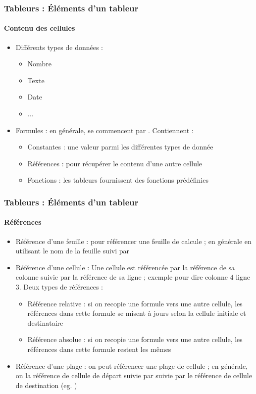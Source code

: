 \documentclass[xcolor=table, usenames,dvipsnames]{beamer}
\begin{document}
\begin{frame}
\frametitle{Tableurs : Éléments d'un tableur}
\framesubtitle{Contenu des cellules}

\begin{itemize}
	\item Différents types de données : 
	\begin{itemize}
		\item Nombre
		\item Texte
		\item Date 
		\item ...
	\end{itemize}

	\item Formules : en générale, se commencent par \keyword{=}. Contiennent :
	\begin{itemize}
		\item Constantes : une valeur parmi les différentes types de donnée
		\item Références : pour récupérer le contenu d'une autre cellule
		\item Fonctions : les tableurs fournissent des fonctions prédéfinies 
	\end{itemize}
	
\end{itemize}


\end{frame}

\begin{frame}
\frametitle{Tableurs : Éléments d'un tableur}
\framesubtitle{Références}

\begin{itemize}
	\item Référence d'une feuille : pour référencer une feuille de calcule ; en générale en utilisant le nom de la feuille suivi par \keyword{!}
	\item Référence d'une cellule : Une cellule est référencée par la référence de sa colonne suivie par la référence de sa ligne ; exemple  pour dire colonne 4 ligne 3. Deux types de références : 
	\begin{itemize}
		\item Référence relative : si on recopie une formule vers une autre cellule, les références dans cette formule se misent à jours selon la cellule initiale et destinataire
		\item Référence absolue : si on recopie une formule vers une autre cellule, les références dans cette formule restent les mêmes
	\end{itemize}
	\item Référence d'une plage : on peut référencer une plage de cellule ; en générale, on la référence de cellule de départ suivie par \keyword{:} suivie par le référence de cellule de destination (eg. )
\end{itemize}
\end{frame}
\end{document}
